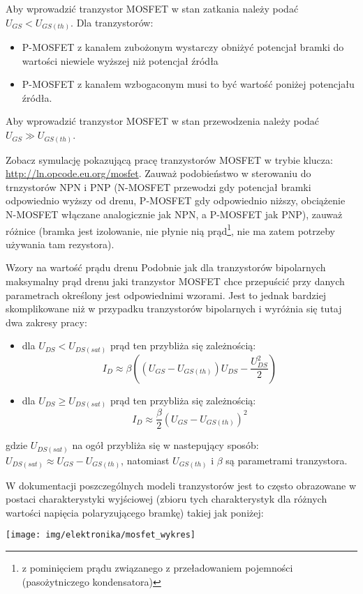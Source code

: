 Aby wprowadzić tranzystor MOSFET w stan zatkania należy podać $U_{GS} < U_{GS (th)}$. Dla tranzystorów:
\begin{itemize}
\item P-MOSFET z kanałem zubożonym wystarczy obniżyć potencjał bramki do wartości niewiele wyższej niż potencjał źródła
\item P-MOSFET z kanałem wzbogaconym musi to być wartość poniżej potencjału źródła.
\end{itemize}
Aby wprowadzić tranzystor MOSFET w stan przewodzenia należy podać $U_{GS} \gg U_{GS (th)}$.

\vspace{12pt}

Zobacz symulację pokazującą pracę tranzystorów MOSFET w trybie klucza: \url{http://ln.opcode.eu.org/mosfet}.
Zauważ podobieństwo w sterowaniu do trnzystorów NPN i PNP (N-MOSFET przewodzi gdy potencjał bramki odpowiednio wyższy od drenu, P-MOSFET gdy odpowiednio niższy, obciążenie N-MOSFET włączane analogicznie jak NPN, a P-MOSFET jak PNP),
	zauważ różnice (bramka jest izolowanie, nie płynie nią prąd\footnote{z pominięciem prądu związanego z przeładowaniem pojemności (pasożytniczego kondensatora)}, nie ma zatem potrzeby używania tam rezystora).

\begin{ProTip}{Wzory na wartość prądu drenu }
Podobnie jak dla tranzystorów bipolarnych maksymalny prąd drenu jaki tranzystor MOSFET chce przepuścić przy danych parametrach określony jest odpowiednimi wzorami.
Jest to jednak bardziej skomplikowane niż w przypadku tranzystorów bipolarnych i wyróżnia się tutaj dwa zakresy pracy:
\begin{itemize}
\item dla $U_{DS} < U_{DS (sat)}$ prąd ten przybliża się zależnością:
$$ I_D \approx \beta \left( (U_{GS} - U_{GS (th)}) U_{DS} - \frac{U_{DS}^2}{2} \right) $$
\item dla $U_{DS} ≥ U_{DS (sat)}$ prąd ten przybliża się zależnością:
$$ I_D \approx \frac{\beta}{2} (U_{GS} - U_{GS (th)})^2 $$
\end{itemize}
gdzie $U_{DS (sat)}$ na ogół przybliża się w nastepujący sposób: $U_{DS (sat)} \approx U_{GS} - U_{GS (th)}$, natomiast $U_{GS (th)}$ i $\beta$ są parametrami tranzystora.

W dokumentacji poszczególnych modeli tranzystorów jest to często obrazowane w postaci charakterystyki wyjściowej (zbioru tych charakterystyk dla różnych wartości napięcia polaryzującego bramkę) takiej jak poniżej:

\begin{center}\texttt{[image: img/elektronika/mosfet\_wykres]}\end{center}
\end{ProTip}

